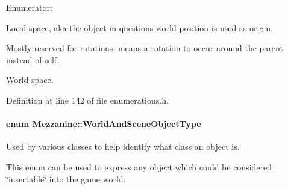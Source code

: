 \begin{Desc}
\item[Enumerator: ]\par
\begin{description}
\item[{\em 
\hypertarget{namespaceMezzanine_ad81c74de3529f1e643bd145173924ed3aa1986039b3e4c80c8564c8916e68e61c}{
TS\_\-Local}
\label{namespaceMezzanine_ad81c74de3529f1e643bd145173924ed3aa1986039b3e4c80c8564c8916e68e61c}
}]Local space, aka the object in questions world position is used as origin. \item[{\em 
\hypertarget{namespaceMezzanine_ad81c74de3529f1e643bd145173924ed3a352c41c07844c77508ce36b43a30b553}{
TS\_\-Parent}
\label{namespaceMezzanine_ad81c74de3529f1e643bd145173924ed3a352c41c07844c77508ce36b43a30b553}
}]Mostly reserved for rotations, means a rotation to occur around the parent instead of self. \item[{\em 
\hypertarget{namespaceMezzanine_ad81c74de3529f1e643bd145173924ed3aeb8fde3835a59be182f10353d961882d}{
TS\_\-World}
\label{namespaceMezzanine_ad81c74de3529f1e643bd145173924ed3aeb8fde3835a59be182f10353d961882d}
}]\hyperlink{classMezzanine_1_1World}{World} space. \end{description}
\end{Desc}



Definition at line 142 of file enumerations.h.

\hypertarget{namespaceMezzanine_ae8cd04f706f4998be62f454b7119c718}{
\paragraph[{WorldAndSceneObjectType}]{\setlength{\rightskip}{0pt plus 5cm}enum {\bf Mezzanine::WorldAndSceneObjectType}}\hfill}
\label{namespaceMezzanine_ae8cd04f706f4998be62f454b7119c718}


Used by various classes to help identify what class an object is. 

This enum can be used to express any object which could be considered \char`\"{}insertable\char`\"{} into the game world. 

